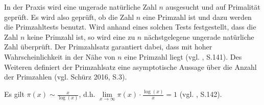 In der Praxis wird eine ungerade natürliche Zahl $n$
ausgesucht und auf Primalität geprüft. Es wird also geprüft,
ob die Zahl $n$ eine Primzahl ist und dazu werden die
Primzahltests benutzt. Wird anhand eines solchen Tests
festgestellt, dass die Zahl $n$ keine Primzahl ist, so
wird eine zu $n$ nächstgelegene ungerade natürliche Zahl
überprüft. Der Primzahlsatz garantiert dabei, dass mit
hoher Wahrscheinlichkeit in der Nähe von $n$ eine Primzahl
liegt (vgl. \cite{karpfingerkiechle}, S.141).
Des Weiteren definiert der Primzahlsatz eine asymptotische
Aussage über die Anzahl der Primzahlen (vgl. Schürz 2016, S.3).

\begin{theorem}[Primzahlsatz]
Es gilt \( \pi (x) \sim \frac{x}{\log(x)}\), d.h.
\( \lim\limits_{x\to\infty} \pi(x)\cdot \frac{\log(x)}{x} = 1 \)
(vgl. \cite{karpfingerkiechle}, S.142).
\end{theorem}

